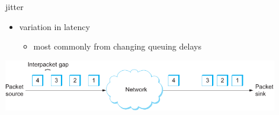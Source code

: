 \begin{frame}{jitter}
\begin{itemize}
\item variation in latency
    \begin{itemize}
    \item most commonly from changing queuing delays
    \end{itemize}
\end{itemize}
\includegraphics[width=0.9\textwidth]{../perf/SysApproach-1-Fig20}
\end{frame}
